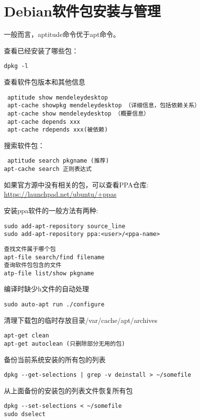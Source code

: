 \section{Debian软件包安装与管理}

一般而言，aptitude命令优于apt命令。

查看已经安装了哪些包：
\begin{verbatim}
dpkg -l
\end{verbatim}

查看软件包版本和其他信息
\begin{verbatim}
 aptitude show mendeleydesktop
 apt-cache showpkg mendeleydesktop （详细信息，包括依赖关系）
 apt-cache show mendeleydesktop （概要信息）
 apt-cache depends xxx
 apt-cache rdepends xxx(被依赖)
\end{verbatim}

搜索软件包：
\begin{verbatim}
 aptitude search pkgname (推荐)
apt-cache search 正则表达式
\end{verbatim}

如果官方源中没有相关的包，可以查看PPA仓库:
\url{https://launchpad.net/ubuntu/+ppas}

安装ppa软件的一般方法有两种:
\begin{verbatim}
sudo add-apt-repository source_line
sudo add-apt-repository ppa:<user>/<ppa-name>
\end{verbatim}

\begin{verbatim}
查找文件属于哪个包
apt-file search/find filename
查询软件包包含的文件
atp-file list/show pkgname
\end{verbatim}

编译时缺少h文件的自动处理
\begin{verbatim}
sudo auto-apt run ./configure
\end{verbatim}

清理下载包的临时存放目录/var/cache/apt/archives
\begin{verbatim}
apt-get clean
apt-get autoclean (只删除部分无用的包)
\end{verbatim}

备份当前系统安装的所有包的列表
\begin{verbatim}
dpkg --get-selections | grep -v deinstall > ~/somefile
\end{verbatim}

从上面备份的安装包的列表文件恢复所有包
\begin{verbatim}
dpkg --set-selections < ~/somefile
sudo dselect
\end{verbatim}

